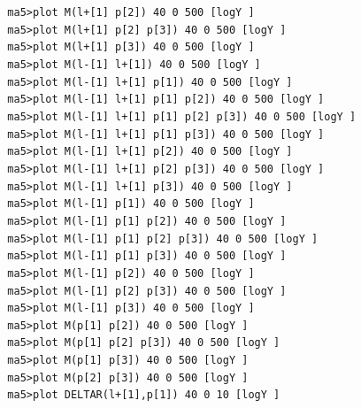 \documentclass[a4paper, 10pt]{article}
\begin{document}
\texttt{ }\texttt{ }\texttt{ma5>plot M(l+[1] p[2]) 40 0  500 [logY ]\\
}
\texttt{ }\texttt{ }\texttt{ma5>plot M(l+[1] p[2] p[3]) 40 0  500 [logY ]\\
}
\texttt{ }\texttt{ }\texttt{ma5>plot M(l+[1] p[3]) 40 0  500 [logY ]\\
}
\texttt{ }\texttt{ }\texttt{ma5>plot M(l-[1] l+[1]) 40 0  500 [logY ]\\
}
\texttt{ }\texttt{ }\texttt{ma5>plot M(l-[1] l+[1] p[1]) 40 0  500 [logY ]\\
}
\texttt{ }\texttt{ }\texttt{ma5>plot M(l-[1] l+[1] p[1] p[2]) 40 0  500 [logY ]\\
}
\texttt{ }\texttt{ }\texttt{ma5>plot M(l-[1] l+[1] p[1] p[2] p[3]) 40 0  500 [logY ]\\
}
\texttt{ }\texttt{ }\texttt{ma5>plot M(l-[1] l+[1] p[1] p[3]) 40 0  500 [logY ]\\
}
\texttt{ }\texttt{ }\texttt{ma5>plot M(l-[1] l+[1] p[2]) 40 0  500 [logY ]\\
}
\texttt{ }\texttt{ }\texttt{ma5>plot M(l-[1] l+[1] p[2] p[3]) 40 0  500 [logY ]\\
}
\texttt{ }\texttt{ }\texttt{ma5>plot M(l-[1] l+[1] p[3]) 40 0  500 [logY ]\\
}
\texttt{ }\texttt{ }\texttt{ma5>plot M(l-[1] p[1]) 40 0  500 [logY ]\\
}
\texttt{ }\texttt{ }\texttt{ma5>plot M(l-[1] p[1] p[2]) 40 0  500 [logY ]\\
}
\texttt{ }\texttt{ }\texttt{ma5>plot M(l-[1] p[1] p[2] p[3]) 40 0  500 [logY ]\\
}
\texttt{ }\texttt{ }\texttt{ma5>plot M(l-[1] p[1] p[3]) 40 0  500 [logY ]\\
}
\texttt{ }\texttt{ }\texttt{ma5>plot M(l-[1] p[2]) 40 0  500 [logY ]\\
}
\texttt{ }\texttt{ }\texttt{ma5>plot M(l-[1] p[2] p[3]) 40 0  500 [logY ]\\
}
\texttt{ }\texttt{ }\texttt{ma5>plot M(l-[1] p[3]) 40 0  500 [logY ]\\
}
\texttt{ }\texttt{ }\texttt{ma5>plot M(p[1] p[2]) 40 0  500 [logY ]\\
}
\texttt{ }\texttt{ }\texttt{ma5>plot M(p[1] p[2] p[3]) 40 0  500 [logY ]\\
}
\texttt{ }\texttt{ }\texttt{ma5>plot M(p[1] p[3]) 40 0  500 [logY ]\\
}
\texttt{ }\texttt{ }\texttt{ma5>plot M(p[2] p[3]) 40 0  500 [logY ]\\
}
\texttt{ }\texttt{ }\texttt{ma5>plot DELTAR(l+[1],p[1]) 40 0 10 [logY ]\\
}
\end{document}
